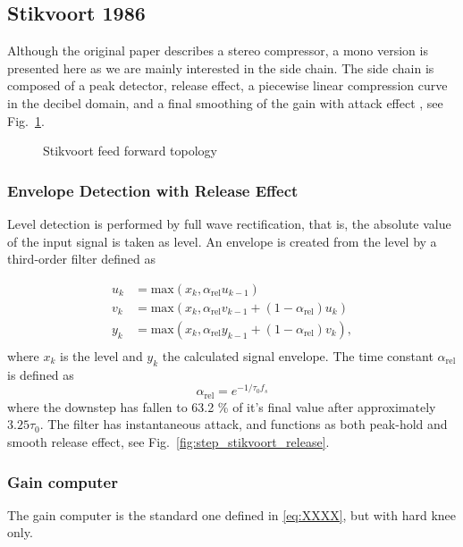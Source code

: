 \documentclass[../main2.tex]{subfiles}
\providecommand{\rootdir}{..}
\begin{document}
\subsection{Stikvoort 1986}
\FloatBarrier
Although the original paper \cite{stikvoort1986digital} describes a stereo compressor, a mono version is presented here as we are mainly interested in the side chain. The side chain is composed of a peak detector, release effect, a piecewise linear compression curve in the decibel domain, and a final smoothing of the gain with attack effect , see Fig.~\ref{fig:block_stikvoort}.

\begin{figure}[h]
\centerline{}
\caption{Stikvoort feed forward topology}
\label{fig:block_stikvoort}
\end{figure}

\subsubsection{Envelope Detection with Release Effect}
Level detection is performed by full wave rectification, that is, the absolute value of the input signal is taken as level. An envelope is created from the level by a third-order filter defined as

\begin{equation}\label{eq:stikvoort_release}
\begin{split}
u_k &= \text{max}(x_k, \alpha_{\text{rel}} u_{k-1}) \\
v_k &= \text{max}(x_k, \alpha_{\text{rel}} v_{k-1} + (1-\alpha_{\text{rel}}) u_k) \\
y_k &= \text{max}(x_k, \alpha_{\text{rel}} y_{k-1} + (1-\alpha_{\text{rel}}) v_k),\\
\end{split}
\end{equation}
where $x_k$ is the level and $y_k$ the calculated signal envelope.  The time constant $\alpha_{\text{rel}}$ is defined as
\begin{equation}
\alpha_\text{rel} = e^{-1/\tau_0 f_s}
\end{equation}
where the downstep has fallen to 63.2 \% of it's final value after approximately $3.25 \tau_0$. The filter has instantaneous attack, and functions as both peak-hold and smooth release effect, see Fig.~\ref{fig:step_stikvoort_release}.

\subsubsection{Gain computer}
The gain computer is the standard one defined in \eqref{eq:XXXX}, but with hard knee only.
\end{document}
